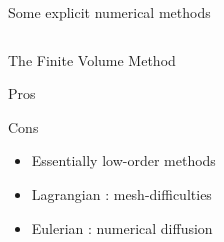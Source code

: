 \begin{withoutheadline}
\begin{frame}{Some explicit numerical methods}
\begin{overprint}
\begin{columns}
\begin{column}{0.49\textwidth}
\begin{block}{The Finite Volume Method \cite{Leveque}}
\begin{footnotesize}
\begin{block}{\footnotesize Pros}
\begin{itemize}
                \end{itemize}
              \end{block}
              \vspace{-0.2cm}
              \begin{block}{\footnotesize Cons}
                \vspace{-0.2cm}
                \begin{itemize}
                \item[] Essentially low-order methods
                \item[] Lagrangian \cite{Haider_FVM}: mesh-difficulties %
                \item[] Eulerian \cite{Gavrilyuk}: numerical diffusion%
                \end{itemize}
              \end{block}
            \end{footnotesize}
          \end{block}
        \end{column}
      \end{columns}
      
      \vspace{-0.3cm} 
    \end{overprint}
  \end{frame}
\end{withoutheadline}

